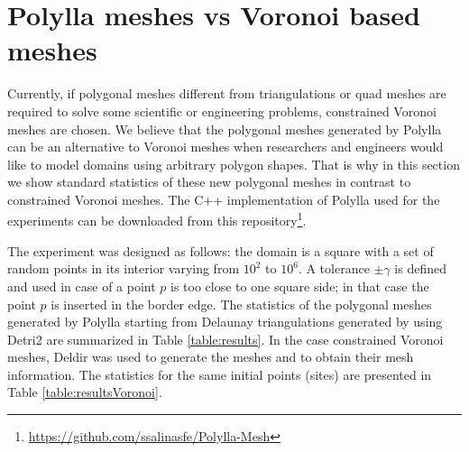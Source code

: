 \documentclass[lineno,pdflatex,sn-mathphys]{sn-jnl}%
\theoremstyle{thmstyleone}%
\theoremstyle{thmstyletwo}%
\theoremstyle{thmstylethree}%
\begin{document}






\section{Polylla meshes vs Voronoi based meshes}
\label{sec:experimental_evaluation}

Currently, if polygonal meshes different from triangulations or quad meshes are required to solve some scientific or engineering problems,  constrained Voronoi meshes are chosen. We believe that the polygonal meshes generated by Polylla  can be an alternative to Voronoi meshes when researchers and engineers would like to model domains using arbitrary polygon shapes. That is why in this section we show standard statistics of these new polygonal meshes  in contrast to constrained  Voronoi meshes. The C++ implementation of Polylla used for the experiments can be downloaded from this repository\footnote{\url{https://github.com/ssalinasfe/Polylla-Mesh}}.

The experiment was designed as follows: the domain is a square with  a set of random points in its interior varying from $10^2$ to $10^6$. A tolerance $\pm \gamma$ is defined and used in case of  a point $p$ is too close to one square side; in that case the point $p$ is inserted in the border edge.  The statistics of the polygonal meshes generated by Polylla starting from Delaunay triangulations generated  by using Detri2 \cite{Detri2} are summarized in Table \ref{table:results}.  In the case constrained Voronoi meshes, Deldir \cite{deldir} was used to generate the meshes and to obtain their mesh  information. The statistics for the same initial points (sites) are presented in Table \ref{table:resultsVoronoi}.


\end{document}
